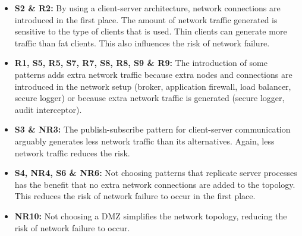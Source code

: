 \documentclass[a4paper,11pt]{report}
\begin{document}
\begin{itemize}
\item \textbf{S2 \& R2:} By using a client-server architecture, network connections are introduced in the first place. The amount of network traffic generated is sensitive to the type of clients that is used. Thin clients can generate more traffic than fat clients. This also influences the risk of network failure.
\item \textbf{R1, S5, R5, S7, R7, S8, R8, S9 \& R9:} The introduction of some patterns adds extra network traffic because extra nodes and connections are introduced in the network setup (broker, application firewall, load balancer, secure logger) or because extra network traffic is generated (secure logger, audit interceptor).
\item \textbf{S3 \& NR3:} The publish-subscribe pattern for client-server communication arguably generates less network traffic than its alternatives. Again, less network traffic reduces the risk.
\item \textbf{S4, NR4, S6 \& NR6: } Not choosing patterns that replicate server processes has the benefit that no extra network connections are added to the topology. This reduces the risk of network failure to occur in the first place.
\item \textbf{NR10:} Not choosing a DMZ simplifies the network topology, reducing the risk of network failure to occur.
\end{itemize}
\end{document}
